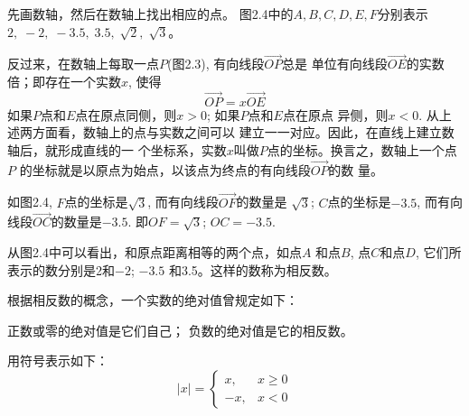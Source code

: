 \begin{solution}
    先画数轴，然后在数轴上找出相应的点。
图2.4中的$A,B,C,D,E,F$分别表示$2,\; -2,\; -3.5,\; 
3.5,\; \sqrt{2},\; \sqrt{3}$。

\begin{figure}[htp]
    \centering
{}
    \caption{}
\end{figure}
\end{solution}


反过来，在数轴上每取一点$P$(图2.3), 有向线段$\Vec{OP}$总是
单位有向线段$\Vec{OE}$的实数倍；即存在一个实数$x$, 使得
\[\Vec{OP}=x\Vec{OE} \]
如果$P$点和$E$点在原点同侧，则$x>0$; 如果$P$点和$E$点在原点
异侧，则$x<0$. 从上述两方面看，数轴上的点与实数之间可以
建立一一对应。因此，在直线上建立数轴后，就形成直线的一
个坐标系，实数$x$叫做$P$点的坐标。换言之，数轴上一个点$P$
的坐标就是以原点为始点，以该点为终点的有向线段$\Vec{OP}$的数
量。

如图2.4, $F$点的坐标是$\sqrt{3}$, 而有向线段$\Vec{OF}$的数量是
$\sqrt{3}$; $C$点的坐标是$-3.5$, 而有向线段$\Vec{OC}$的数量是$-3.5$. 即$OF=\sqrt{3}$; $OC=-3.5$.

从图2.4中可以看出，和原点距离相等的两个点，如点$A$
和点$B$, 点$C$和点$D$, 它们所表示的数分别是2和$-2$; $-3.5$
和3.5。这样的数称为相反数。

根据相反数的概念，一个实数的绝对值曾规定如下：
\begin{blk}{}
    正数或零的绝对值是它们自己；
负数的绝对值是它的相反数。
\end{blk}

用符号表示如下：
\[|x|=\begin{cases}
    x, & x\ge 0\\
    -x, & x<0
\end{cases}\]

